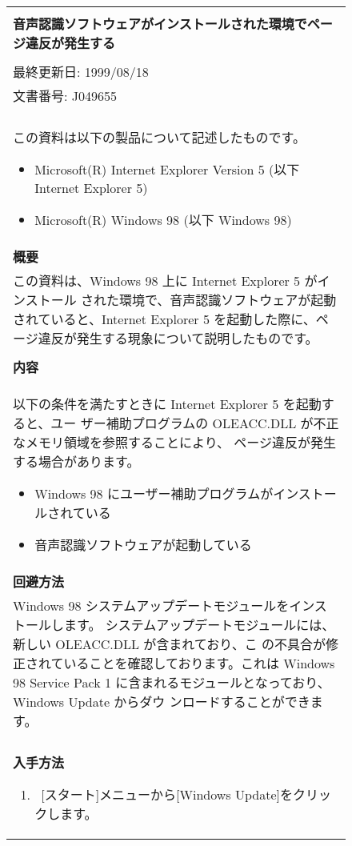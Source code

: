 \begin{figure}
  \begin{center}
   \tiny
   \begin{tabular}{|p{12cm}|} \hline
    \\
    {\small\bf 音声認識ソフトウェアがインストールされた環境でページ違反が発生する} \\
    \\
    最終更新日: 1999/08/18 \\
    文書番号: J049655 \\
    \\
    この資料は以下の製品について記述したものです。
    \begin{itemize}

     \item Microsoft(R) Internet Explorer Version 5 (以下 Internet Explorer 5)
     \item Microsoft(R) Windows 98 (以下 Windows 98)
    \end{itemize}
    \\
    {\bf 概要} \\
    この資料は、Windows 98 上に Internet Explorer 5 がインストール
    された環境で、音声認識ソフトウェアが起動されていると、Internet Explorer
    5 を起動した際に、ページ違反が発生する現象について説明したものです。 \\
    \\
    {\bf 内容} \\
    以下の条件を満たすときに Internet Explorer 5 を起動すると、ユー
    ザー補助プログラムの OLEACC.DLL が不正なメモリ領域を参照することにより、
    ページ違反が発生する場合があります。
    \begin{itemize}
     \item Windows 98 にユーザー補助プログラムがインストールされている
     \item 音声認識ソフトウェアが起動している
    \end{itemize}
    \\
    {\bf 回避方法} \\
    Windows 98 システムアップデートモジュールをインストールします。
    システムアップデートモジュールには、新しい OLEACC.DLL が含まれており、こ
    の不具合が修正されていることを確認しております。これは Windows 98
    Service Pack 1 に含まれるモジュールとなっており、Windows Update からダウ
    ンロードすることができます。 \\
    \\
    {\bf 入手方法}
    \begin{enumerate}
     \item \ [スタート]メニューから[Windows Update]をクリックします。

\end{enumerate}
\end{tabular}
\end{center}
\end{figure}
